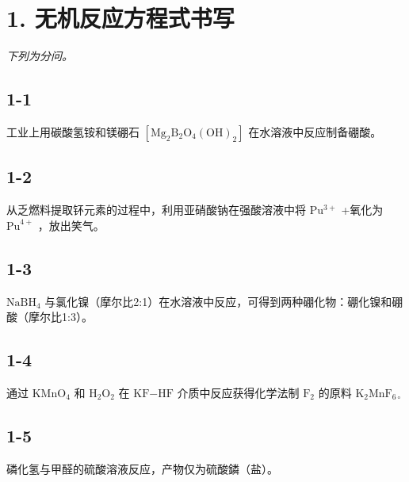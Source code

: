 \section*{1. 无机反应方程式书写}
\textit{下列为分问。}

\subsection*{1-1}
⼯业上⽤碳酸氢铵和镁硼⽯ $\mathrm { [ M g _ { 2 } B _ { 2 } O _ { 4 } ( O H ) _ { 2 } ] }$ 在⽔溶液中反应制备硼酸。

\subsection*{1-2}
从乏燃料提取钚元素的过程中，利⽤亚硝酸钠在强酸溶液中将 $\mathrm { P u ^ { 3 + } }$ +氧化为 $\mathrm { P u } ^ { 4 + }$ ，放出笑⽓。

\subsection*{1-3}
$\mathrm { N a B H _ { 4 } }$ 与氯化镍（摩尔⽐2:1）在⽔溶液中反应，可得到两种硼化物：硼化镍和硼酸（摩尔⽐1:3）。

\subsection*{1-4}
通过 $\mathrm { K M n O } _ { 4 }$ 和 $\mathrm { H } _ { 2 } \mathrm { O } _ { 2 }$ 在 $\mathrm { K F \mathrm { - H F } }$ 介质中反应获得化学法制 $\mathrm { F } _ { 2 }$ 的原料 $\mathrm { K _ { 2 } M n F _ { 6 \circ } }$

\subsection*{1-5}
磷化氢与甲醛的硫酸溶液反应，产物仅为硫酸鏻（盐）。
